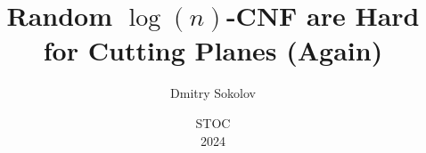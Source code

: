 

\titlegraphic{
    
}


\title[]{
    Random $\log(n)$-CNF are Hard for Cutting Planes (Again)
}

\author{
    Dmitry Sokolov
}  


\date{
    STOC\\
    2024
}






    \maketitle

    
    
    

